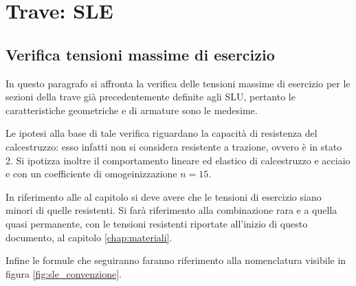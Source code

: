 \chapter{Trave: SLE}
\section{Verifica tensioni massime di esercizio}
In questo paragrafo si affronta la verifica delle tensioni massime di esercizio per le sezioni della trave già precedentemente definite agli SLU, pertanto le caratteristiche geometriche e di armature sono le medesime.

Le ipotesi alla base di tale verifica riguardano la capacità di resistenza del calcestruzzo: esso infatti non si considera resistente a trazione, ovvero è in stato 2.
Si ipotizza inoltre il comportamento lineare ed elastico di calcestruzzo e acciaio e con un coefficiente di omogeinizzazione $n = 15$.

In riferimento alle  al capitolo  si deve avere che le tensioni di esercizio siano minori di quelle resistenti.
Si farà riferimento alla combinazione rara e a quella quasi permanente, con le tensioni resistenti riportate all'inizio di questo documento, al capitolo \ref{chap:materiali}.

Infine le formule che seguiranno faranno riferimento alla nomenclatura visibile in figura \ref{fig:sle_convenzione}.

